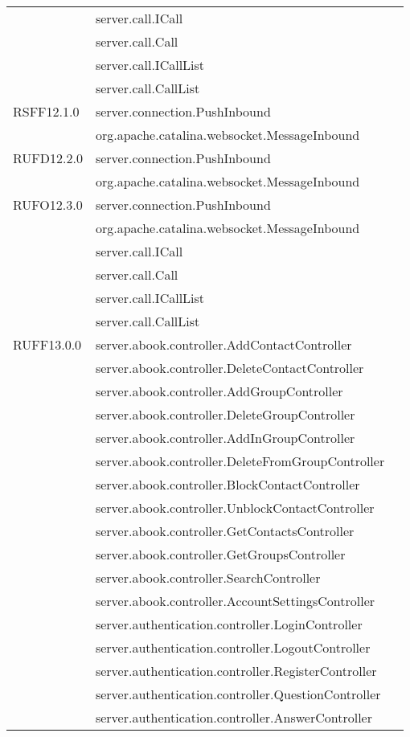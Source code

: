 \begin{center}
\begin{longtable}{lp{}l}
 & server.call.ICall\\
& server.call.Call\\
 & server.call.ICallList\\
& server.call.CallList\\
RSFF12.1.0 & server.connection.PushInbound\\
& org.apache.catalina.websocket.MessageInbound\\
RUFD12.2.0 & server.connection.PushInbound\\
& org.apache.catalina.websocket.MessageInbound\\
RUFO12.3.0 & server.connection.PushInbound\\
& org.apache.catalina.websocket.MessageInbound\\
 & server.call.ICall\\
& server.call.Call\\
 & server.call.ICallList\\
& server.call.CallList\\
RUFF13.0.0 & server.abook.controller.AddContactController\\
& server.abook.controller.DeleteContactController\\
& server.abook.controller.AddGroupController\\
& server.abook.controller.DeleteGroupController\\
& server.abook.controller.AddInGroupController\\
& server.abook.controller.DeleteFromGroupController\\
& server.abook.controller.BlockContactController\\
& server.abook.controller.UnblockContactController\\
& server.abook.controller.GetContactsController\\
& server.abook.controller.GetGroupsController\\
& server.abook.controller.SearchController\\
& server.abook.controller.AccountSettingsController\\
& server.authentication.controller.LoginController\\
& server.authentication.controller.LogoutController\\
& server.authentication.controller.RegisterController\\
& server.authentication.controller.QuestionController\\
& server.authentication.controller.AnswerController\\

\end{longtable}
\end{center}
